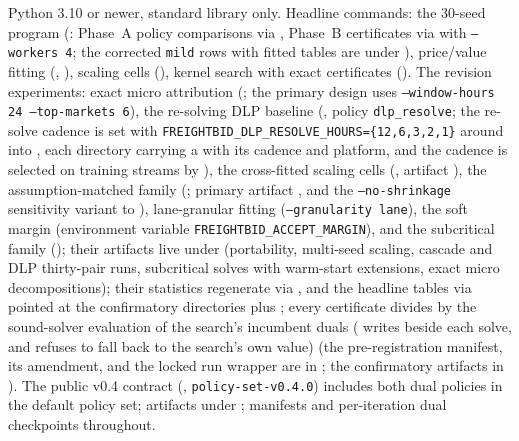\documentclass[11pt]{article}
\begin{document}
Python 3.10 or newer, standard library only. Headline commands: the
30-seed program (: Phase~A policy
comparisons via , Phase~B
certificates via  with
\texttt{--workers 4}; the corrected \texttt{mild} rows with fitted
tables are under ), price/value fitting
(, ),
scaling cells (),
kernel search with exact certificates
(). The revision experiments: exact
micro attribution (; the primary
design uses \texttt{--window-hours 24 --top-markets 6}), the
re-solving DLP baseline (, policy
\texttt{dlp\_resolve}; the re-solve cadence is set with
\texttt{FREIGHTBID\_DLP\_RESOLVE\_HOURS=\{12,6,3,2,1\}} around
 into
, each
directory carrying a  with its cadence and
platform, and the cadence is selected on training streams by
), the cross-fitted scaling cells
(, artifact
), the
assumption-matched family
(; primary artifact
, and the
\texttt{--no-shrinkage} sensitivity variant to
),
lane-granular fitting
(\texttt{--granularity lane}), the soft margin (environment variable
\texttt{FREIGHTBID\_ACCEPT\_MARGIN}), and the subcritical family
(); their
artifacts live under  (portability,
multi-seed scaling, cascade and DLP thirty-pair runs, subcritical
solves with warm-start extensions, exact micro decompositions);
their statistics regenerate via
, and the headline tables via
 pointed at the confirmatory
directories plus ; every
certificate divides by the sound-solver evaluation of the search's
incumbent duals ( writes
 beside each solve, and
 refuses to fall back to the search's
own value) (the
pre-registration manifest, its amendment, and the locked run wrapper
are in ; the
confirmatory artifacts in ). The
public v0.4 contract
(,
\texttt{policy-set-v0.4.0}) includes both dual policies in the default
policy set; artifacts under ; manifests
and per-iteration dual checkpoints throughout.



\end{document}
